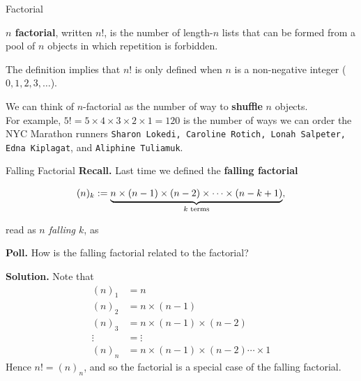 \documentclass[10pt]{beamer}
\begin{document}
\begin{frame}{Factorial}

\begin{mygreenbox}[title=Definition]
\textbf{$n$ factorial}, written $n!$, is the number of length-$n$ lists that can be formed from a pool of $n$ objects in which repetition is forbidden. 
\end{mygreenbox}

\vfill 
\pause 

\begin{myredbox}[title=Technical Note]
 The definition implies that $n!$ is only defined when $n$ is a non-negative integer ($0,1,2,3,\hdots$).
\end{myredbox}

\vfill 
\pause 

\begin{myyellowbox}[title=Interpretation]
We can think of $n$-factorial as the number of way to \textbf{shuffle}  $n$ objects. \\

For example, $5! = 5 \times 4 \times 3 \times 2 \times 1 = 120$ is the number of ways we can order the NYC Marathon runners  \texttt{Sharon Lokedi, Caroline Rotich, Lonah Salpeter, Edna Kiplagat}, and     \texttt{Aliphine Tuliamuk}.
\end{myyellowbox}


\end{frame}


\begin{frame}{Falling Factorial}
\small 
\colorbox{red!30}{\textbf{Recall.}} Last time we defined the \textbf{falling factorial}

\[ (n)_k \defeq \explaintermbrace{$k$ terms}{n \times (n-1) \times (n-2) \times \cdots \times (n-k+1)}, \]

read as \textit{$n$ falling $k$}, as \pause 

\vfill 
\pause 
\colorbox{yellow!30}{\textbf{Poll.}} How is the falling factorial related to the factorial?

\vfill 
\pause 
\colorbox{green!30}{\textbf{Solution.}} Note that
%
\begin{align*}
(n)_1 &= n \\
(n)_2 &= n \times (n-1) \\
(n)_3 &= n \times  (n-1) \times (n-2) \\
\vdots &= \vdots \\
(n)_n &= n \times (n-1) \times (n-2) \cdots \times 1
\end{align*}
%
Hence $n!=(n)_n$, and so the factorial is a special case of the falling factorial.

\end{frame}
\end{document}
